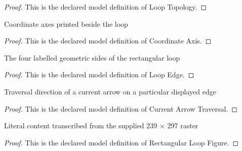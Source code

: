 \begin{proof}
  This is the declared model definition of Loop Topology.
\end{proof}
\begin{definition}
  \label{def:physics:phyx-mini-0947:phyxminiproblems-problemphyxmini0947-coordinateaxis}
  Coordinate axes printed beside the loop
\end{definition}
\begin{proof}
  This is the declared model definition of Coordinate Axis.
\end{proof}
\begin{definition}
  \label{def:physics:phyx-mini-0947:phyxminiproblems-problemphyxmini0947-loopedge}
  The four labelled geometric sides of the rectangular loop
\end{definition}
\begin{proof}
  This is the declared model definition of Loop Edge.
\end{proof}
\begin{definition}
  \label{def:physics:phyx-mini-0947:phyxminiproblems-problemphyxmini0947-currentarrowtraversal}
  Traversal direction of a current arrow on a particular displayed edge
\end{definition}
\begin{proof}
  This is the declared model definition of Current Arrow Traversal.
\end{proof}
\begin{definition}
  \label{def:physics:phyx-mini-0947:phyxminiproblems-problemphyxmini0947-rectangularloopfigure}
  Literal content transcribed from the supplied 239 × 297 raster
\end{definition}
\begin{proof}
  This is the declared model definition of Rectangular Loop Figure.
\end{proof}

